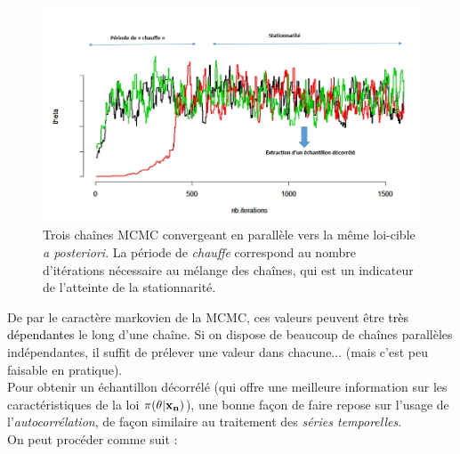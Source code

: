 \begin{figure}[!h]
\centering
\includegraphics[scale=0.45]{figures/calcul/mcmc-FR-1.jpeg}
\caption{Trois cha\^ines MCMC convergeant en parall\`ele vers la m\^eme loi-cible {\it a posteriori}. La p\'eriode de {\it chauffe} correspond au nombre d'it\'erations n\'ecessaire au m\'elange des cha\^ines, qui est un indicateur de l'atteinte de la stationnarit\'e. }
\label{ex-mcmc-1}
\end{figure} 


De par le caractère markovien de la MCMC, ces valeurs peuvent être \textcolor{black}{très dépendantes} le long d'une chaîne. Si on dispose de beaucoup de chaînes parallèles indépendantes, il suffit de prélever une valeur dans chacune... (mais c'est peu faisable en pratique). \\


 Pour obtenir un échantillon décorrélé (qui offre une meilleure information sur les caractéristiques de la loi $\pi(\theta|{\bf x_n})$), une bonne fa\c con de faire repose sur l'usage de l'\emph{autocorrélation}, de fa\c con similaire au traitement des \emph{séries temporelles}. \\
 
 On peut procéder comme suit :
 
